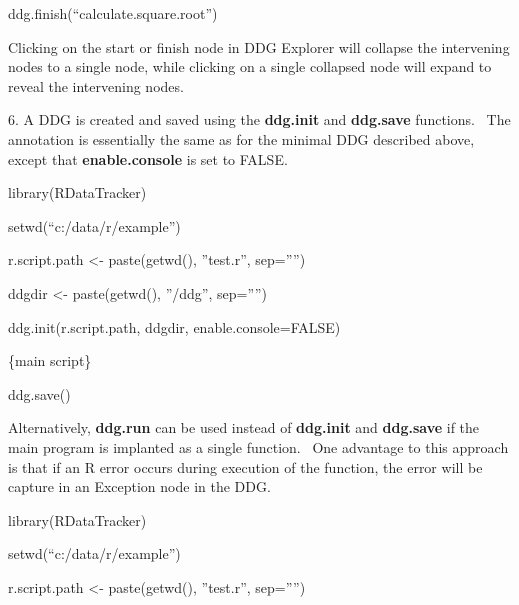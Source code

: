\documentclass[letterpaper]{article}
\begin{document}
\bigskip

\textcolor[rgb]{0.21176471,0.37254903,0.5686275}{ddg.finish(``calculate.square.root'')}


\bigskip

Clicking on the start or finish node in DDG Explorer will collapse the intervening nodes to a single node, while clicking on a single collapsed node will expand to reveal the intervening nodes.


\bigskip

6. A DDG is created and saved using the \textbf{ddg.init} and \textbf{ddg.save} functions. \ The annotation is essentially the same as for the minimal DDG described above, except that \textbf{enable.console} is set to FALSE.


\bigskip

\textcolor[rgb]{0.21176471,0.37254903,0.5686275}{library(RDataTracker)}

\textcolor[rgb]{0.21176471,0.37254903,0.5686275}{setwd(``c:/data/r/example'')}

\textcolor[rgb]{0.21176471,0.37254903,0.5686275}{r.script.path {\textless}- paste(getwd(), ''test.r'', sep=''{}'')}

\textcolor[rgb]{0.21176471,0.37254903,0.5686275}{ddgdir {\textless}- paste(getwd(), ''/ddg'', sep=''{}'')}

\textcolor[rgb]{0.21176471,0.37254903,0.5686275}{ddg.init(r.script.path, ddgdir, enable.console=FALSE)}


\bigskip

\textcolor[rgb]{0.21176471,0.37254903,0.5686275}{\{main script\}}


\bigskip

\textcolor[rgb]{0.21176471,0.37254903,0.5686275}{ddg.save()}


\bigskip

Alternatively, \textbf{ddg.run} can be used instead of \textbf{ddg.init} and \textbf{ddg.save} if the main program is implanted as a single function. \ One advantage to this approach is that if an R error occurs during execution of the function, the error will be capture in an Exception node in the DDG.


\bigskip

\textcolor[rgb]{0.21176471,0.37254903,0.5686275}{library(RDataTracker)}

\textcolor[rgb]{0.21176471,0.37254903,0.5686275}{setwd(``c:/data/r/example'')}

\textcolor[rgb]{0.21176471,0.37254903,0.5686275}{r.script.path {\textless}- paste(getwd(), ''test.r'', sep=''{}'')}
\end{document}

